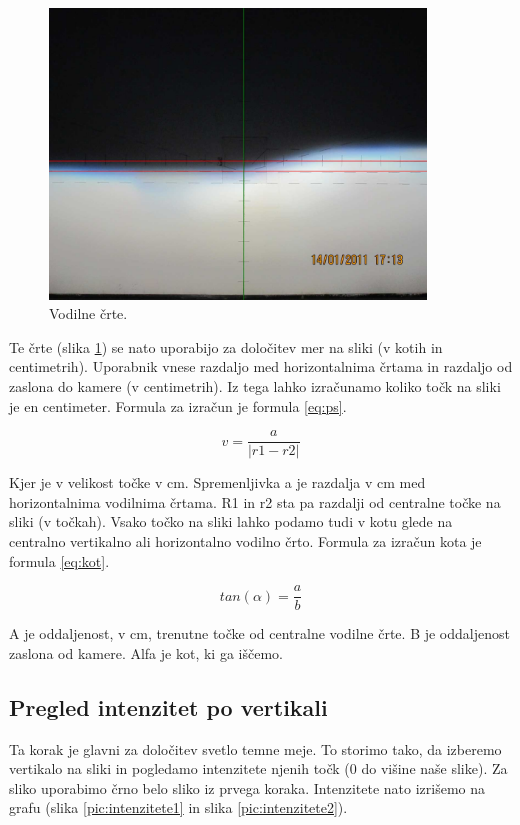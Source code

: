 \documentclass[oneside, a4paper, 12pt]{book}
\begin{document}
\begin{figure}
\begin{center}
\includegraphics[width=10cm]{slike/vodilne-crte.jpg}
\end{center}
\caption{Vodilne črte.}
\label{pic:vodilne-crte}
\end{figure}

Te črte (slika \ref{pic:vodilne-crte}) se nato uporabijo za določitev mer na sliki (v kotih in centimetrih). Uporabnik vnese razdaljo med horizontalnima črtama in razdaljo od zaslona do kamere (v centimetrih). Iz tega lahko izračunamo koliko točk na sliki je en centimeter. Formula za izračun je formula \ref{eq:ps}.

\begin{equation}
v=\dfrac{a}{|r1-r2|}
\label{eq:ps}
\end{equation}


Kjer je v velikost točke v cm. Spremenljivka a je razdalja v cm med horizontalnima vodilnima črtama. R1 in r2 sta pa razdalji od centralne točke na sliki (v točkah).
Vsako točko na sliki lahko podamo tudi v kotu glede na centralno vertikalno ali horizontalno vodilno črto. Formula za izračun kota je formula \ref{eq:kot}.

\begin{equation}
tan(\alpha)=\dfrac{a}{b}
\label{eq:kot}
\end{equation}

A je oddaljenost, v cm, trenutne točke od centralne vodilne črte. B je oddaljenost zaslona od kamere. Alfa je kot, ki ga iščemo.

\subsection{Pregled intenzitet po vertikali}
Ta korak je glavni za določitev svetlo temne meje. To storimo tako, da izberemo vertikalo na sliki in pogledamo intenzitete njenih točk (0 do višine naše slike). Za sliko uporabimo črno belo sliko iz prvega koraka. Intenzitete nato izrišemo na grafu (slika \ref{pic:intenzitete1} in slika \ref{pic:intenzitete2}).
\end{document}
